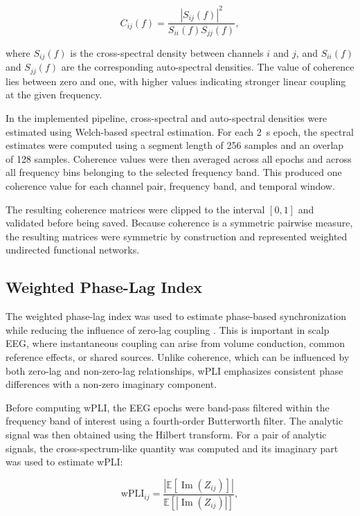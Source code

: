\[
    C_{ij}(f) =
    \frac{|S_{ij}(f)|^2}{S_{ii}(f)S_{jj}(f)},
\]

where $S_{ij}(f)$ is the cross-spectral density between channels $i$ and $j$,
and $S_{ii}(f)$ and $S_{jj}(f)$ are the corresponding auto-spectral densities.
The value of coherence lies between zero and one, with higher values indicating
stronger linear coupling at the given frequency.

In the implemented pipeline, cross-spectral and auto-spectral densities were
estimated using Welch-based spectral estimation. For each \SI{2}{\second}
epoch, the spectral estimates were computed using a segment length of
\num{256} samples and an overlap of \num{128} samples. Coherence values were
then averaged across all epochs and across all frequency bins belonging to the
selected frequency band. This produced one coherence value for each channel
pair, frequency band, and temporal window.

The resulting coherence matrices were clipped to the interval $[0,1]$ and
validated before being saved. Because coherence is a symmetric pairwise measure,
the resulting matrices were symmetric by construction and represented weighted
undirected functional networks.

\subsection{Weighted Phase-Lag Index}
\label{subsec:wpli}

The weighted phase-lag index was used to estimate phase-based synchronization
while reducing the influence of zero-lag coupling \cite{Vinck2011,Lanzone2022}. This is important in scalp
EEG, where instantaneous coupling can arise from volume conduction, common
reference effects, or shared sources. Unlike coherence, which can be influenced
by both zero-lag and non-zero-lag relationships, wPLI emphasizes consistent
phase differences with a non-zero imaginary component.

Before computing wPLI, the EEG epochs were band-pass filtered within the
frequency band of interest using a fourth-order Butterworth filter. The analytic
signal was then obtained using the Hilbert transform. For a pair of analytic
signals, the cross-spectrum-like quantity was computed and its imaginary part
was used to estimate wPLI:

\[
    \mathrm{wPLI}_{ij}
    =
    \frac{
        \left|
        \mathbb{E}\left[\operatorname{Im}(Z_{ij})\right]
        \right|
    }{
        \mathbb{E}\left[
        \left|\operatorname{Im}(Z_{ij})\right|
        \right]
    },
\]

